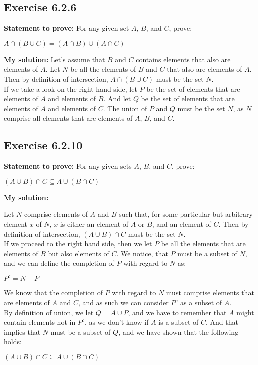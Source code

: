 \documentclass{article}
\newcommand{\cent}[1]{\begin{center}#1\end{center}}
\newcommand{\Prove}{\textbf{Statement to prove: }}
\newcommand{\Solution}{\textbf{My solution: }}
\newcommand{\QED}{\boxed{}}
\newcommand{\Exercise}[1]{\subsection{Exercise #1}}
\begin{document}
	\Exercise{6.2.6}
	
	\Prove
	For any given set $A$, $B$, and $C$, prove:
	
	\cent{$A \cap (B \cup C) = (A \cap B) \cup (A \cap C)$}
	
	\Solution
	Let's assume that $B$ and $C$ contains elements that also are elements of $A$. Let $N$ be all the elements of $B$ and $C$ that also are elements of $A$. Then by definition of intersection, $A \cap (B \cup C)$  must be the set $N$.\\
	
	If we take a look on the right hand side, let $P$ be the set of elements that are elements of $A$ and elements of $B$. And let $Q$ be the set of elements that are elements of $A$ and elements of $C$. The union of $P$ and $Q$ must be the set $N$, as $N$ comprise all elements that are elements of $A$, $B$, and $C$.\\
	\QED
	
	\Exercise{6.2.10}
	
	\Prove
	For any given sets $A$, $B$, and $C$, prove:
	
	\cent{$(A \cup B) \cap C \subseteq A \cup (B \cap C)$}
	
	\Solution
	
	Let $N$ comprise elements of $A$ and $B$ such that, for some particular but arbitrary element $x$ of $N$, $x$ is either an element of $A$ or $B$, and an element of $C$. Then by definition of intersection, $(A \cup B) \cap C$ must be the set $N$. \\
	
	If we proceed to the right hand side, then we let $P$ be all the elements that are elements of $B$ but also elements of $C$. We notice, that $P$ must  be a subset of $N$, and we can define the completion of $P$ with regard to $N$ as:
	
	\cent{$P^c = N - P$}
	
	We know that the completion of $P$ with regard to $N$ must comprise elements that are elements of $A$ and $C$, and as such we can consider $P^c$ as a subset of $A$.\\
	
	By definition of union, we let $Q = A \cup P$, and we have to remember that $A$ might contain elements not in $P^c$, as we don't know if $A$ is a subset of $C$. And that implies that $N$ must be a subset of $Q$, and we have shown that the following holds:
	
	\cent{$(A \cup B) \cap C \subseteq A \cup (B \cap C)$}
	
\end{document}
